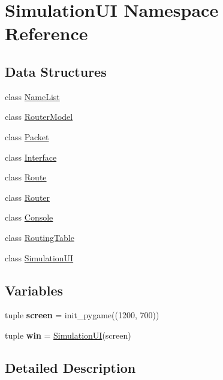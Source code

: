 \hypertarget{namespaceSimulationUI}{\section{Simulation\-U\-I Namespace Reference}
\label{namespaceSimulationUI}
}
\subsection*{Data Structures}
\begin{DoxyCompactItemize}
\item 
class \hyperlink{classSimulationUI_1_1NameList}{Name\-List}
\item 
class \hyperlink{classSimulationUI_1_1RouterModel}{Router\-Model}
\item 
class \hyperlink{classSimulationUI_1_1Packet}{Packet}
\item 
class \hyperlink{classSimulationUI_1_1Interface}{Interface}
\item 
class \hyperlink{classSimulationUI_1_1Route}{Route}
\item 
class \hyperlink{classSimulationUI_1_1Router}{Router}
\item 
class \hyperlink{classSimulationUI_1_1Console}{Console}
\item 
class \hyperlink{classSimulationUI_1_1RoutingTable}{Routing\-Table}
\item 
class \hyperlink{classSimulationUI_1_1SimulationUI}{Simulation\-U\-I}
\end{DoxyCompactItemize}
\subsection*{Variables}
\begin{DoxyCompactItemize}
\item 
\hypertarget{namespaceSimulationUI_a7b8b83178e943463031148e82e75cf06}{tuple {\bfseries screen} = init\-\_\-pygame((1200, 700))}\label{namespaceSimulationUI_a7b8b83178e943463031148e82e75cf06}

\item 
\hypertarget{namespaceSimulationUI_abcac25d96e8de6d39dcb1e3d1e6d1572}{tuple {\bfseries win} = \hyperlink{classSimulationUI_1_1SimulationUI}{Simulation\-U\-I}(screen)}\label{namespaceSimulationUI_abcac25d96e8de6d39dcb1e3d1e6d1572}

\end{DoxyCompactItemize}


\subsection{Detailed Description}
 